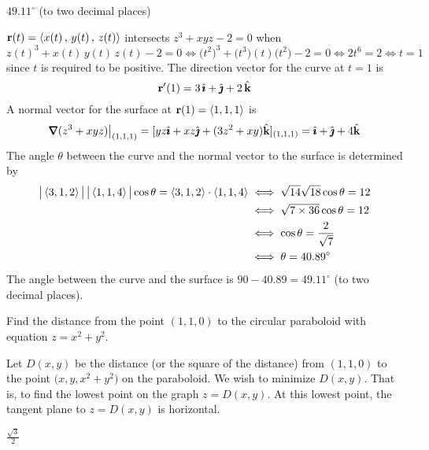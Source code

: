 \begin{answer}
$49.11^\circ$ (to two decimal places)
\end{answer}

\begin{solution}
$\mathbf{r}(t)=\left< x(t)\,,\,y(t)\,,\,z(t)\right>$ intersects $z^3 + xyz -2 = 0$ when
\begin{equation*}
z(t)^3+x(t)\,y(t)\,z(t)-2=0\iff \big(t^2\big)^3 + \big(t^3)(t)\big(t^2\big)-2=0
\iff 2t^6=2\iff t=1
\end{equation*}
since $t$ is required to be positive.
The direction vector for the curve at $t=1$ is
\begin{equation*}
\mathbf{r}'(1)=3\,\hat{\pmb{\imath}}+\hat{\pmb{\jmath}}+2\,\hat{\mathbf{k}}
\end{equation*}
A normal vector for the surface at $\mathbf{r}(1)=\left< 1,1,1\right>$ is
\begin{equation*}
\vnabla(z^3+xyz)\big|_{(1,1,1)}=[yz\hi+xz\hj+(3z^2+xy)\hk]_{(1,1,1)}
=\hi+\hj+4\hk
\end{equation*}
The angle $\theta$ between the curve and the normal vector to the surface
is determined by
\begin{align*}
\big|\left< 3,1,2\right>\big|\,\big|\left< 1,1,4\right>\big|\cos\theta
             =\left< 3,1,2\right> \cdot\left< 1,1,4\right>
&\iff \sqrt{14}\sqrt{18}\cos\theta=12 \\
&\iff \sqrt{7\times 36}\cos\theta=12 \\
&\iff \cos\theta=\frac{2}{\sqrt{7}} \\
&\iff \theta=40.89^\circ
\end{align*}
The angle between the curve and the surface is 
$90-40.89=49.11^\circ$ (to two decimal places).
\end{solution}

\begin{question}
Find the distance from the point $(1,1,0)$ to the circular
paraboloid with equation $z=x^2+y^2$.
\end{question}

\begin{hint}
Let $D(x,y)$ be the distance (or the square of the distance) from $(1,1,0)$ 
to the point $\big(x,y, x^2+y^2)$ on the paraboloid. We wish to 
minimize $D(x,y)$. That is, to find the lowest point on the graph 
$z=D(x,y)$. At this lowest point, the tangent plane to $z=D(x,y)$ is 
horizontal.
\end{hint}

\begin{answer}
$\frac{\sqrt{3}}{2}$
\end{answer}

